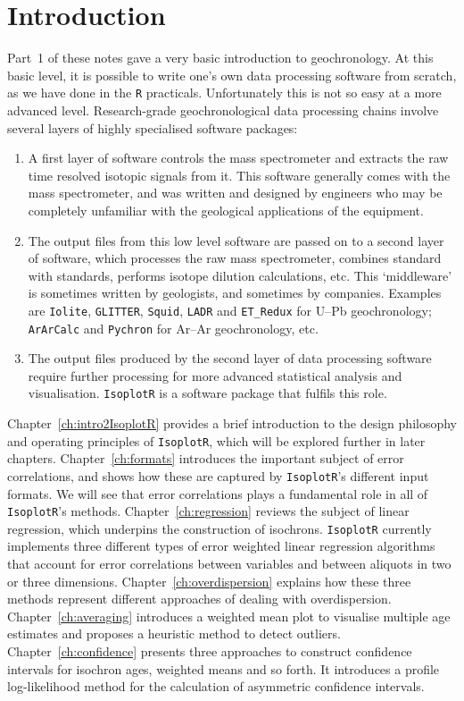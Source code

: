 \chapter{Introduction}
\label{ch:intro2}

Part~1 of these notes gave a very basic introduction to geochronology.
At this basic level, it is possible to write one's own data processing
software from scratch, as we have done in the \texttt{R} practicals.
Unfortunately this is not so easy at a more advanced level.
Research-grade geochronological data processing chains involve several
layers of highly specialised software packages:

\begin{enumerate}
\item A first layer of software controls the mass spectrometer and
  extracts the raw time resolved isotopic signals from it. This
  software generally comes with the mass spectrometer, and was written
  and designed by engineers who may be completely unfamiliar with the
  geological applications of the equipment.
\item The output files from this low level software are passed on to a
  second layer of software, which processes the raw mass spectrometer,
  combines standard with standards, performs isotope dilution
  calculations, etc. This `middleware' is sometimes written by
  geologists, and sometimes by companies. Examples are
  \texttt{Iolite}, \texttt{GLITTER}, \texttt{Squid}, \texttt{LADR} and
  \texttt{ET\_Redux} for U--Pb geochronology; \texttt{ArArCalc} and
  \texttt{Pychron} for Ar--Ar geochronology, etc.
\item The output files produced by the second layer of data processing
  software require further processing for more advanced statistical
  analysis and visualisation. \texttt{IsoplotR} is a software package
  that fulfils this role.
\end{enumerate}

Chapter~\ref{ch:intro2IsoplotR} provides a brief introduction to the
design philosophy and operating principles of \texttt{IsoplotR}, which
will be explored further in later chapters.  Chapter~\ref{ch:formats}
introduces the important subject of error correlations, and shows how
these are captured by \texttt{IsoplotR}'s different input formats.  We
will see that error correlations plays a fundamental role in all of
\texttt{IsoplotR}'s methods.  Chapter~\ref{ch:regression} reviews the
subject of linear regression, which underpins the construction of
isochrons. \texttt{IsoplotR} currently implements three different
types of error weighted linear regression algorithms that account for
error correlations between variables and between aliquots in two or
three dimensions.  Chapter~\ref{ch:overdispersion} explains how these
three methods represent different approaches of dealing with
overdispersion.  Chapter~\ref{ch:averaging} introduces a weighted mean
plot to visualise multiple age estimates and proposes a heuristic
method to detect outliers.  Chapter~\ref{ch:confidence} presents three
approaches to construct confidence intervals for isochron ages,
weighted means and so forth.  It introduces a profile log-likelihood
method for the calculation of asymmetric confidence intervals.\\

